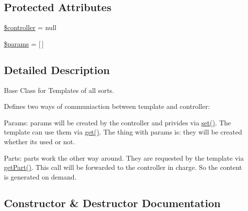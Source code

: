 \subsection*{Protected Attributes}
\begin{DoxyCompactItemize}
\item 
\hyperlink{classWEPPO_1_1Presentation_1_1TemplateBase_a7cdce844fed099ef42f6b1aec8e20279}{\$controller} = null
\item 
\hyperlink{classWEPPO_1_1Presentation_1_1TemplateBase_ae75957248eb5759beec80bbe0317cf8a}{\$params} = \mbox{[}$\,$\mbox{]}
\end{DoxyCompactItemize}


\subsection{Detailed Description}
Base Class for Templates of all sorts.

Defines two ways of communiaction between template and controller\+:
\begin{DoxyItemize}
\item Params\+: params will be created by the controller and privides via \hyperlink{classWEPPO_1_1Presentation_1_1TemplateBase_af4bee053712054122263fb75bd1c47ab}{set()}. The template can use them via \hyperlink{classWEPPO_1_1Presentation_1_1TemplateBase_a5be83129d029e94060fe6056e024cae7}{get()}. The thing with params is\+: they will be created whether it\textquotesingle{}s used or not.
\item Parts\+: parts work the other way around. They are requested by the template via \hyperlink{classWEPPO_1_1Presentation_1_1TemplateBase_aae20cdd328f9e5314a39e6a610e2878a}{get\+Part()}. This call will be forwarded to the controller in charge. So the content is generated on demand. 
\end{DoxyItemize}

\subsection{Constructor \& Destructor Documentation}
